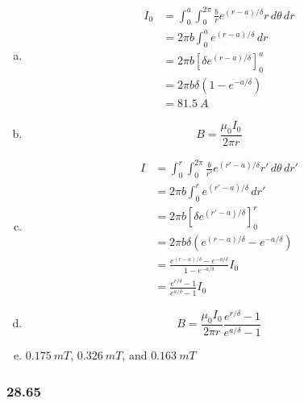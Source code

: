 \documentclass{article}
\begin{document}
\begin{enumerate}[(a)]
  \item

        \begin{align*}
          I_0 & = \int_0^a \int_0^{2\pi} \frac{b}{r} e^{(r - a) / \delta} r \, d \theta \,dr \\
              & = 2 \pi b \int_0^a e^{(r - a) / \delta} \,dr                                 \\
              & = 2 \pi b \left[ \delta e^{(r - a) / \delta} \right]_0^a                     \\
              & = 2 \pi b \delta \left( 1 - e^{-a / \delta} \right)                          \\
              & = \qty{81.5}{A}
        \end{align*}

  \item \[B = \frac{\mu_0 I_0}{2 \pi r}\]

  \item

        \begin{align*}
          I & = \int_0^r \int_0^{2 \pi} \frac{b}{r'} e^{(r' - a) / \delta} r' \,d \theta \,dr' \\
            & = 2 \pi b \int_0^r e^{(r' - a) / \delta} \,dr'                                   \\
            & = 2 \pi b \left[ \delta e^{(r' - a) / \delta} \right]_0^r                        \\
            & = 2 \pi b \delta \left( e^{(r - a) / \delta} - e^{-a / \delta} \right)           \\
            & = \frac{e^{(r - a) / \delta} - e^{-a / \delta}}{1 - e^{-a / \delta}} I_0         \\
            & = \frac{e^{r / \delta} - 1}{e^{a / \delta} - 1} I_0
        \end{align*}

  \item \[B = \frac{\mu_0 I_0}{2 \pi r} \frac{e^{r / \delta} - 1}{e^{a / \delta} - 1}\]

  \item $\qty{0.175}{mT}$, $\qty{0.326}{mT}$, and $\qty{0.163}{mT}$
\end{enumerate}

\subsubsection{28.65}
\end{document}
